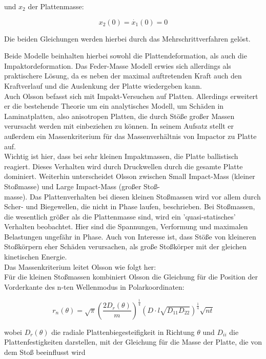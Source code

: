 und $x_{2}$ der Plattenmasse:

\begin{equation}
	x_{2}(0)=\dot{x_{1}}(0)=0
\end{equation}

Die beiden Gleichungen werden hierbei durch das Mehrschrittverfahren gelöst. 

Beide Modelle beinhalten hierbei sowohl die Plattendeformation, als auch die Impaktordeformation. Das Feder-Masse Modell erwies sich allerdings als praktischere Lösung, da es neben der maximal auftretenden Kraft auch den Kraftverlauf und die Auslenkung der Platte wiedergeben kann. \\
Auch Olsson \cite{Olsson.2000} befasst sich mit Impakt-Versuchen auf Platten. Allerdings erweitert er die bestehende Theorie um ein analytisches Modell, um Schäden in Laminatplatten, also anisotropen Platten, die durch Stöße großer Massen verursacht werden mit einbeziehen zu können. In seinem Aufsatz stellt er außerdem ein Massenkriterium für das Massenverhältnis von Impactor zu Platte auf.\\
Wichtig ist hier, dass bei sehr kleinen Impaktmassen, die Platte ballistisch reagiert. Dieses Verhalten wird durch Druckwellen durch die gesamte Platte dominiert. Weiterhin unterscheidet Olsson zwischen Small Impact-Mass (kleiner Stoßmasse) und Large Impact-Mass (großer Stoß-\\masse). Das Plattenverhalten bei diesen kleinen Stoßmassen wird vor allem durch Scher- und Biegewellen, die nicht in Phase laufen, beschrieben. Bei Stoßmassen, die wesentlich größer als die Plattenmasse sind, wird ein 'quasi-statisches' Verhalten beobachtet. Hier sind die Spannungen, Verformung und maximalen Belastungen ungefähr in Phase. Auch von Interesse ist, dass Stöße von kleineren Stoßkörpern eher Schäden verursachen, als große Stoßkörper mit der gleichen kinetischen Energie.\\
Das Massenkriterium leitet Olsson wie folgt her:\\
Für die kleinen Stoßmassen kombiniert Olsson die Gleichung für die Position der Vorderkante des n-ten Wellenmodus in Polarkoordinaten:

\begin{equation}
	r_{n}(\theta) = \sqrt{\pi}(\frac{2D_{r}(\theta)}{m})^{\frac{1}{4}} (D \cdot l\sqrt{D_{11}D_{22}})^{\frac{1}{4}}\sqrt{nt}
\end{equation}

wobei $D_{r}(\theta)$ die radiale Plattenbiegesteifigkeit in Richtung $\theta$ und $D_{ii}$ die Plattenfestigkeiten darstellen, mit der Gleichung für die Masse der Platte, die von dem Stoß beeinflusst wird

